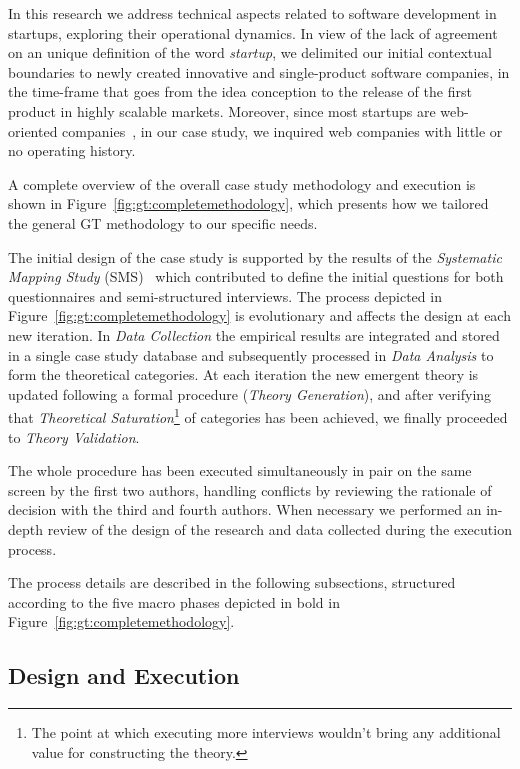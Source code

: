\documentclass[10pt,journal,letterpaper,compsoc]{IEEEtran}
\begin{document}
In this research we address technical aspects related to software development
in startups, exploring their operational dynamics. In view of the lack of
agreement on an unique definition of the word \textit{startup}, we delimited our
initial contextual boundaries to newly created innovative and single-product
software companies, in the time-frame that goes from the idea conception to the
release of the first product in highly scalable markets. Moreover, since most
startups are web-oriented companies~\cite{tc-webstartups-link, Allen2003}, in
our case study, we inquired web companies with little or no operating history.

A complete overview of the overall case study methodology and execution is
shown in Figure~\ref{fig:gt:completemethodology}, which presents how we tailored
the general GT methodology to our specific needs.


The initial design of the case study is supported by the results of the
\textit{Systematic Mapping Study} (SMS)~\cite{SMS} which contributed to define
the initial questions for both questionnaires and semi-structured interviews.
The process depicted in Figure~\ref{fig:gt:completemethodology} is evolutionary
and affects the design at each new iteration. In \textit{Data Collection} the
empirical results are integrated and stored in a single case study database and
subsequently processed in \textit{Data Analysis} to form the theoretical
categories. At each iteration the new emergent theory is updated following a
formal procedure (\textit{Theory Generation}), and after verifying that
\textit{Theoretical Saturation}\footnote{The point at which executing more
interviews wouldn't bring any additional value for constructing the theory.} of
categories has been achieved, we finally proceeded to \textit{Theory
Validation}.

The whole procedure has been executed simultaneously in pair on the same screen
by the first two authors, handling conflicts by reviewing the rationale of
decision with the third and fourth authors. When necessary we performed an in-
depth review of the design of the research and data collected during the
execution process.

The process details are described in the following subsections, structured
according to the five macro phases depicted in bold in 
Figure~\ref{fig:gt:completemethodology}.



\subsection{Design and Execution} \label{desex}
\end{document}
